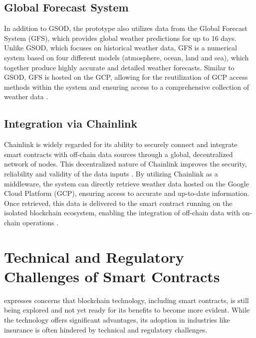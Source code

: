 \subsection{Global Forecast System}\label{GFS}
In addition to GSOD, the prototype also utilizes data from the Global Forecast System (GFS), which provides global weather predictions for up to 16 days. Unlike GSOD, which focuses on historical weather data, GFS is a numerical system based on four different models (atmosphere, ocean, land and sea), which together produce highly accurate and detailed weather forecasts. Similar to GSOD, GFS is hosted on the GCP, allowing for the reutilization of GCP access methods within the system and ensuring access to a comprehensive collection of weather data \autocite{NOAA_GSOD_2020}.

\subsection{Integration via Chainlink}
Chainlink is widely regarded for its ability to securely connect and integrate smart contracts with off-chain data sources through a global, decentralized network of nodes. This decentralized nature of Chainlink improves the security, reliability and validity of the data inputs \autocite{beniiche2020study}. By utilizing Chainlink as a middleware, the system can directly retrieve weather data hosted on the Google Cloud Platform (GCP), ensuring access to accurate and up-to-date information. Once retrieved, this data is delivered to the smart contract running on the isolated blockchain ecosystem, enabling the integration of off-chain data with on-chain operations \autocite{goswami2022towards}.

\section{Technical and Regulatory Challenges of Smart Contracts}\label{section:regulatory_technical_challenges}
\textcite{gatteschi2018blockchain} expresses concerns that blockchain technology, including smart contracts, is still being explored and not yet ready for its benefits to become more evident. While the technology offers significant advantages, its adoption in industries like insurance is often hindered by technical and regulatory challenges.

